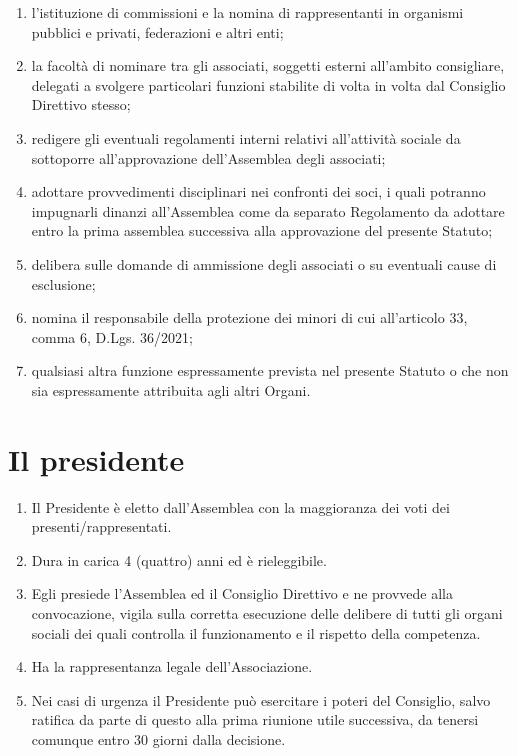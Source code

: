 \documentclass{djtsdoc}
\begin{document}
\begin{enumerate}
\begin{enumerate}
			\item l'istituzione di commissioni e la nomina di rappresentanti in organismi pubblici e privati, federazioni e altri enti;
			\item la facoltà di nominare tra gli associati, soggetti esterni all'ambito consigliare, delegati a svolgere particolari funzioni stabilite di volta in volta dal Consiglio Direttivo stesso;
			\item redigere gli eventuali regolamenti interni relativi all'attività sociale da sottoporre all'approvazione dell'Assemblea degli associati;
			\item adottare provvedimenti disciplinari nei confronti dei soci, i quali potranno impugnarli dinanzi all'Assemblea come da separato Regolamento da  adottare  entro la prima assemblea successiva alla approvazione del presente Statuto;
			\item delibera sulle domande di ammissione degli associati o su eventuali cause di esclusione;
			\item nomina il responsabile della protezione dei minori di cui all'articolo 33, comma 6, D.Lgs. 36/2021;
			\item qualsiasi altra funzione espressamente prevista nel presente Statuto o che non sia espressamente attribuita agli altri Organi.
		\end{enumerate}
	\end{enumerate}
	
	\section{Il presidente}
	\begin{enumerate}
		\item Il Presidente è eletto dall'Assemblea con la maggioranza dei voti dei presenti/rappresentati.
		\item Dura in carica 4 (quattro) anni ed è rieleggibile.
		\item Egli presiede l'Assemblea ed il Consiglio Direttivo e ne provvede alla convocazione, vigila sulla corretta esecuzione delle delibere di tutti gli organi sociali dei quali controlla il funzionamento e il rispetto della competenza.
		\item Ha la rappresentanza legale dell'Associazione.
		\item Nei casi di urgenza il Presidente può esercitare i poteri del Consiglio, salvo ratifica da parte di questo alla prima riunione utile successiva, da tenersi comunque entro 30 giorni dalla decisione.
	\end{enumerate}
	
\end{document}
